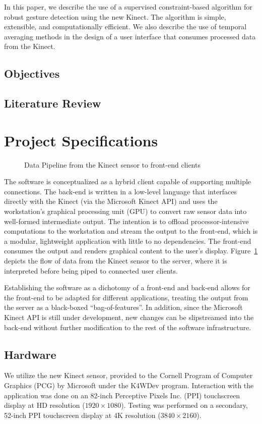 \documentclass{scrartcl}
\begin{document}
    In this paper, we describe the use of a supervised constraint-based algorithm for robust gesture detection using the new Kinect. The algorithm is simple, extensible, and computationally efficient. We also describe the use of temporal averaging methods in the design of a user interface that consumes processed data from the Kinect.
    \subsection{Objectives}
    \subsection{Literature Review}
  \section{Project Specifications}
    \begin{figure}[ht!]
      \centering
      \caption{Data Pipeline from the Kinect sensor to front-end clients\label{fig:pipeline}}
    \end{figure}
    The software is conceptualized as a hybrid client capable of supporting multiple connections. The back-end is written in a low-level language that interfaces directly with the Kinect (via the Microsoft Kinect API) and uses the workstation's graphical processing unit (GPU) to convert raw sensor data into well-formed intermediate output. The intention is to offload processor-intensive computations to the workstation and stream the output to the front-end, which is a modular, lightweight application with little to no dependencies. The front-end consumes the output and renders graphical content to the user's display. Figure~\ref{fig:pipeline} depicts the flow of data from the Kinect sensor to the server, where it is interpreted before being piped to connected user clients.

    Establishing the software as a dichotomy of a front-end and back-end allows for the front-end to be adapted for different applications, treating the output from the server as a black-boxed ``bag-of-features''. In addition, since the Microsoft Kinect API is still under development, new changes can be slipstreamed into the back-end without further modification to the rest of the software infrastructure.
    \subsection{Hardware}
      We utilize the new Kinect sensor, provided to the Cornell Program of Computer Graphics (PCG) by Microsoft under the K4WDev program. Interaction with the application was done on an 82-inch Perceptive Pixels Inc. (PPI) touchscreen display at HD resolution ($1920 \times 1080$). Testing was performed on a secondary, 52-inch PPI touchscreen display at 4K resolution ($3840 \times 2160$).
\end{document}
